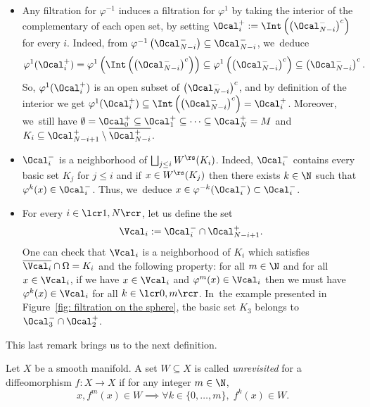 \skpt
\begin{remark}\label{rk: filtration}
\begin{itemize}
\item Any filtration for $\varphi^{-1}$ induces a filtration for $\varphi^{1}$ by taking the interior of the complementary of each open set, \ie by setting $\Ocal_{i}^{+}:= \Int \left(\left(\Ocal_{N-i}^{-} \right)^c \right)$ for every $i$. Indeed, from $\varphi^{-1} \left(\Ocal_{N-i}^- \right) \subseteq \Ocal_{N-i}^-$, we~deduce
\[
\varphi^1 (\Ocal_{i}^+) = \varphi^1 \left(\Int \left(\left(\Ocal_{N-i}^- \right)^c \right) \right) \subseteq \varphi^1 \left(\left(\Ocal_{N-i}^- \right)^c \right) \subseteq \left(\Ocal_{N-i}^- \right)^c.
\]
So, $\varphi^1 (\Ocal_{i}^+)$ is an open subset of $\left(\Ocal_{N-i}^- \right)^c$, and by definition of the interior we get $\varphi^1 (\Ocal_{i}^+) \subseteq \Int \left(\left(\Ocal_{N-i}^- \right)^c \right) = \Ocal_{i}^+$.
Moreover, we~still have $\emptyset = \Ocal_0^+ \subseteq \Ocal_{1}^+ \subseteq \cdots \subseteq \Ocal_N^+ =\nobreak M$ and $K_{i} \subseteq \Ocal_{N-i+1}^+ \setminus \overline{\Ocal_{N-i}^+}$.
\item $\Ocal_i^- $ is a neighborhood of $\bigsqcup_{j\leq i} W^\rs (K_i)$. Indeed, $\Ocal_i^- $ contains every basic set $K_j$ for $j \leq i$ and if
$x \in W^\rs (K_j)$ then there exists $k \in \N$ such that $\varphi^k (x) \in \Ocal_i^-$. Thus, we~deduce $x \in \varphi^{-k} (\Ocal_i^-) \subset \Ocal_i^-$.
\item For every $i\in\lcr1,N\rcr$, let us define the set
\[
\Vcal_i:= \Ocal_i^- \cap \Ocal_{N-i+1}^+.
\]
One can check that $\Vcal_i$ is a neighborhood of $K_i$ which satisfies $\overline{\Vcal_i}\cap \Omega = K_i$ and the following property: for all $m \in \N$ and for all $x \in \Vcal_i$, if we have $x \in \Vcal_i$ and $\varphi^m (x) \in \Vcal_i$ then we must have $\varphi^k (x) \in \Vcal_i$ for all $k\in\lcr0,m\rcr$. In~the example presented in Figure~\ref{fig: filtration on the sphere}, the basic set $K_3$ belongs to $\Ocal_3^- \cap \Ocal_2^+$.
\end{itemize}
\end{remark}

This last remark brings us to the next definition.

\begin{definition}Let $X$ be a smooth manifold. A set $W \subseteq X$ is called \emph{unrevisited} for a diffeomorphism $f: X \to X$ if for any integer $m \in \N$,
\[
x, f^m (x) \in W \implies \forall k \in \{0,\dots,m \},\; f^k (x) \in W.
\]
\end{definition}

